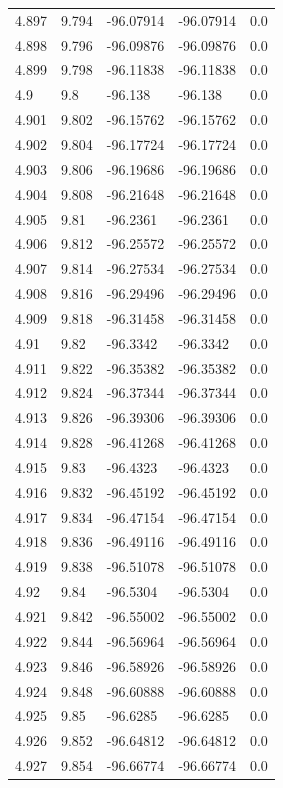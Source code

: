 \begin{tabular}{lllll}
4.897 & 9.794 & -96.07914 & -96.07914 & 0.0 \\
4.898 & 9.796 & -96.09876 & -96.09876 & 0.0 \\
4.899 & 9.798 & -96.11838 & -96.11838 & 0.0 \\
4.9 & 9.8 & -96.138 & -96.138 & 0.0 \\
4.901 & 9.802 & -96.15762 & -96.15762 & 0.0 \\
4.902 & 9.804 & -96.17724 & -96.17724 & 0.0 \\
4.903 & 9.806 & -96.19686 & -96.19686 & 0.0 \\
4.904 & 9.808 & -96.21648 & -96.21648 & 0.0 \\
4.905 & 9.81 & -96.2361 & -96.2361 & 0.0 \\
4.906 & 9.812 & -96.25572 & -96.25572 & 0.0 \\
4.907 & 9.814 & -96.27534 & -96.27534 & 0.0 \\
4.908 & 9.816 & -96.29496 & -96.29496 & 0.0 \\
4.909 & 9.818 & -96.31458 & -96.31458 & 0.0 \\
4.91 & 9.82 & -96.3342 & -96.3342 & 0.0 \\
4.911 & 9.822 & -96.35382 & -96.35382 & 0.0 \\
4.912 & 9.824 & -96.37344 & -96.37344 & 0.0 \\
4.913 & 9.826 & -96.39306 & -96.39306 & 0.0 \\
4.914 & 9.828 & -96.41268 & -96.41268 & 0.0 \\
4.915 & 9.83 & -96.4323 & -96.4323 & 0.0 \\
4.916 & 9.832 & -96.45192 & -96.45192 & 0.0 \\
4.917 & 9.834 & -96.47154 & -96.47154 & 0.0 \\
4.918 & 9.836 & -96.49116 & -96.49116 & 0.0 \\
4.919 & 9.838 & -96.51078 & -96.51078 & 0.0 \\
4.92 & 9.84 & -96.5304 & -96.5304 & 0.0 \\
4.921 & 9.842 & -96.55002 & -96.55002 & 0.0 \\
4.922 & 9.844 & -96.56964 & -96.56964 & 0.0 \\
4.923 & 9.846 & -96.58926 & -96.58926 & 0.0 \\
4.924 & 9.848 & -96.60888 & -96.60888 & 0.0 \\
4.925 & 9.85 & -96.6285 & -96.6285 & 0.0 \\
4.926 & 9.852 & -96.64812 & -96.64812 & 0.0 \\
4.927 & 9.854 & -96.66774 & -96.66774 & 0.0 \\

\end{tabular}
